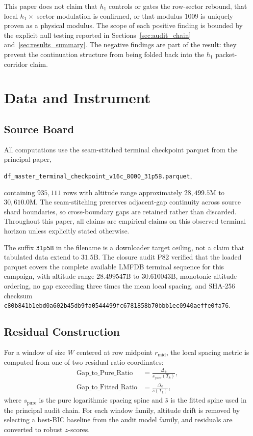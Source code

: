 \documentclass[11pt]{article}
\newcommand{\terminalsha}{c80b841b1ebd0a602b45db9fa0544499fc6781858b70bbb1ec0940aeffe0fa76}
\begin{document}
This paper does not claim that $h_1$ controls or gates the row-sector
rebound, that local $h_1 \times$ sector modulation is confirmed, or that
modulus $1009$ is uniquely proven as a physical modulus. The scope of
each positive finding is bounded by the explicit null testing reported
in Sections~\ref{sec:audit_chain} and~\ref{sec:results_summary}. The
negative findings are part of the result: they prevent the continuation
structure from being folded back into the $h_1$ packet-corridor claim.

\section{Data and Instrument}

\subsection{Source Board}

All computations use the seam-stitched terminal checkpoint parquet from
the principal paper,
\begin{center}
\texttt{df\_master\_terminal\_checkpoint\_v16c\_8000\_31p5B.parquet},
\end{center}
containing $935{,}111$ rows with altitude range approximately
$28{,}499.5\mathrm{M}$ to $30{,}610.0\mathrm{M}$. The seam-stitching
preserves adjacent-gap continuity across source shard boundaries, so
cross-boundary gaps are retained rather than discarded. Throughout this
paper, all claims are empirical claims on this observed terminal horizon
unless explicitly stated otherwise.

The suffix \texttt{31p5B} in the filename is a downloader target
ceiling, not a claim that tabulated data extend to $31.5\mathrm{B}$.
The closure audit P82 verified that the loaded parquet covers the
complete available LMFDB terminal sequence for this campaign, with
altitude range $28.499547\mathrm{B}$ to $30.610043\mathrm{B}$,
monotonic altitude ordering, no gap exceeding three times the mean
local spacing, and SHA-256 checksum
\texttt{\terminalsha}.

\subsection{Residual Construction}

For a window of size $W$ centered at row midpoint $r_{\mathrm{mid}}$,
the local spacing metric is computed from one of two residual-ratio
coordinates:
\begin{align}
    \mathrm{Gap\_to\_Pure\_Ratio}   &= \frac{\Delta_k}{s_{\mathrm{pure}}(T_k)}, \\
    \mathrm{Gap\_to\_Fitted\_Ratio} &= \frac{\Delta_k}{\widehat{s}(T_k)},
\end{align}
where $s_{\mathrm{pure}}$ is the pure logarithmic spacing spine and
$\widehat{s}$ is the fitted spine used in the principal audit chain.
For each window family, altitude drift is removed by selecting a
best-BIC baseline from the audit model family, and residuals are
converted to robust $z$-scores.
\end{document}
